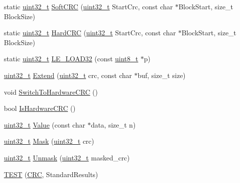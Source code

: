 \begin{DoxyCompactItemize}
\item 
static \hyperlink{stdint_8h_a435d1572bf3f880d55459d9805097f62}{uint32\+\_\+t} \hyperlink{namespaceleveldb_1_1crc32c_af488f9f0d6bc518b954644a250ae2a6d}{Soft\+C\+R\+C} (\hyperlink{stdint_8h_a435d1572bf3f880d55459d9805097f62}{uint32\+\_\+t} Start\+Crc, const char $\ast$Block\+Start, size\+\_\+t Block\+Size)
\item 
static \hyperlink{stdint_8h_a435d1572bf3f880d55459d9805097f62}{uint32\+\_\+t} \hyperlink{namespaceleveldb_1_1crc32c_af3f16569a6ca12790ca53728519acf04}{Hard\+C\+R\+C} (\hyperlink{stdint_8h_a435d1572bf3f880d55459d9805097f62}{uint32\+\_\+t} Start\+Crc, const char $\ast$Block\+Start, size\+\_\+t Block\+Size)
\item 
static \hyperlink{stdint_8h_a435d1572bf3f880d55459d9805097f62}{uint32\+\_\+t} \hyperlink{namespaceleveldb_1_1crc32c_a45e9ab8064b6960bef8f04eaa34fc957}{L\+E\+\_\+\+L\+O\+A\+D32} (const \hyperlink{stdint_8h_aba7bc1797add20fe3efdf37ced1182c5}{uint8\+\_\+t} $\ast$p)
\item 
\hyperlink{stdint_8h_a435d1572bf3f880d55459d9805097f62}{uint32\+\_\+t} \hyperlink{namespaceleveldb_1_1crc32c_ac42fd0618afe635356d722fd29f5ff10}{Extend} (\hyperlink{stdint_8h_a435d1572bf3f880d55459d9805097f62}{uint32\+\_\+t} crc, const char $\ast$buf, size\+\_\+t size)
\item 
void \hyperlink{namespaceleveldb_1_1crc32c_a40ed6712b2d979e093735134e9fbd4b5}{Switch\+To\+Hardware\+C\+R\+C} ()
\item 
bool \hyperlink{namespaceleveldb_1_1crc32c_a9eab70d6926ff585299453228ae0f042}{Is\+Hardware\+C\+R\+C} ()
\item 
\hyperlink{stdint_8h_a435d1572bf3f880d55459d9805097f62}{uint32\+\_\+t} \hyperlink{namespaceleveldb_1_1crc32c_ac004d1e3d8c75b033c162e5ae0a5cc2c}{Value} (const char $\ast$data, size\+\_\+t n)
\item 
\hyperlink{stdint_8h_a435d1572bf3f880d55459d9805097f62}{uint32\+\_\+t} \hyperlink{namespaceleveldb_1_1crc32c_a3790e1e939714a29609e46383aafd6cf}{Mask} (\hyperlink{stdint_8h_a435d1572bf3f880d55459d9805097f62}{uint32\+\_\+t} crc)
\item 
\hyperlink{stdint_8h_a435d1572bf3f880d55459d9805097f62}{uint32\+\_\+t} \hyperlink{namespaceleveldb_1_1crc32c_aef7889069ea26dd145509fff4c4e6b66}{Unmask} (\hyperlink{stdint_8h_a435d1572bf3f880d55459d9805097f62}{uint32\+\_\+t} masked\+\_\+crc)
\item 
\hyperlink{namespaceleveldb_1_1crc32c_a2ef79d6b85c2866295c1573ea6e62a52}{T\+E\+S\+T} (\hyperlink{classleveldb_1_1crc32c_1_1_c_r_c}{C\+R\+C}, Standard\+Results)

\end{DoxyCompactItemize}
